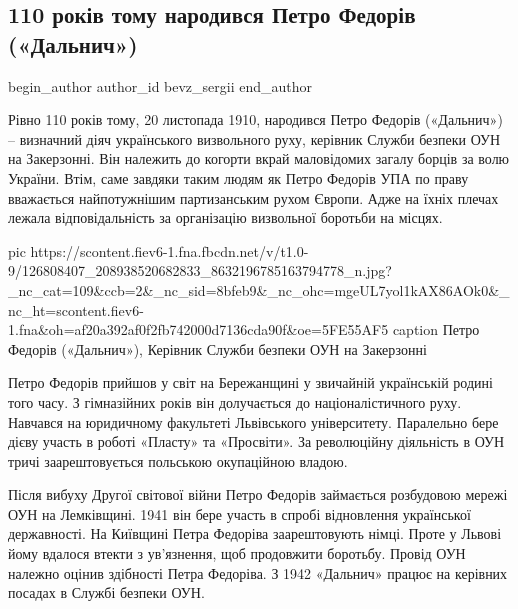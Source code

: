  
 
 
 
 
 
\subsection{110 років тому народився Петро Федорів («Дальнич»)}
\label{sec:20_11_2020.fb.bevz_sergii.1.petro_fedoriv_oun}
\ifcmt
	begin_author
   author_id bevz_sergii
	end_author
\fi


Рівно 110 років тому, 20 листопада 1910, народився Петро Федорів («Дальнич») –
визначний діяч українського визвольного руху, керівник Служби безпеки ОУН на
Закерзонні. Він належить до когорти вкрай маловідомих загалу борців за волю
України. Втім, саме завдяки таким людям як Петро Федорів УПА по праву
вважається найпотужнішим партизанським рухом Європи. Адже на їхніх плечах
лежала відповідальність за організацію визвольної боротьби на місцях.

\ifcmt
pic https://scontent.fiev6-1.fna.fbcdn.net/v/t1.0-9/126808407_208938520682833_8632196785163794778_n.jpg?_nc_cat=109&ccb=2&_nc_sid=8bfeb9&_nc_ohc=mgeUL7yol1kAX86AOk0&_nc_ht=scontent.fiev6-1.fna&oh=af20a392af0f2fb742000d7136cda90f&oe=5FE55AF5
caption Петро Федорів («Дальнич»), Керівник Служби безпеки ОУН на Закерзонні
\fi

Петро Федорів прийшов у світ на Бережанщині у звичайній українській родині того
часу. З гімназійних років він долучається до націоналістичного руху. Навчався
на юридичному факультеті Львівського університету. Паралельно бере дієву участь
в роботі «Пласту» та «Просвіти». За революційну діяльність в ОУН тричі
заарештовується польською окупаційною владою.

Після вибуху Другої світової війни Петро Федорів займається розбудовою мережі
ОУН на Лемківщині. 1941 він бере участь в спробі відновлення української
державності. На Київщині Петра Федоріва заарештовують німці. Проте у Львові
йому вдалося втекти з ув’язнення, щоб продовжити боротьбу. Провід ОУН належно
оцінив здібності Петра Федоріва. З 1942 «Дальнич» працює на керівних посадах в
Службі безпеки ОУН.

